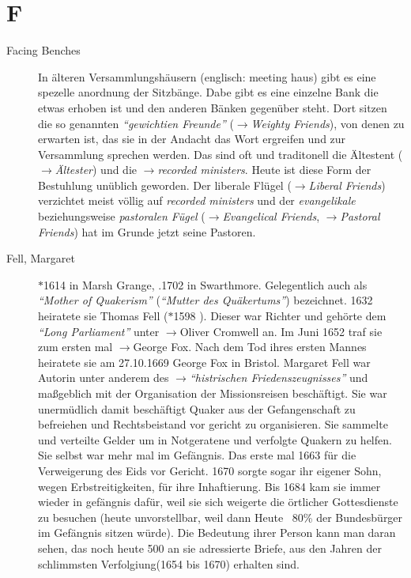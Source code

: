 \section*{F}

\articlesize

\begin{description}

\item[Facing Benches] In älteren Versammlungshäusern (englisch: meeting haus)
gibt es eine spezelle anordnung der Sitzbänge. Dabe gibt es eine einzelne Bank
die etwas erhoben ist und den anderen Bänken gegenüber steht. Dort sitzen die
so genannten \textit{"`gewichtien Freunde"'} ($\to$\textit{Weighty Friends}),
von denen zu erwarten ist, das sie in der Andacht das Wort ergreifen und zur
Versammlung sprechen werden. Das sind oft und traditonell die Ältestent
($\to$\textit{Ältester}) und die $\to$\textit{recorded ministers}. Heute ist
diese Form der Bestuhlung unüblich geworden. Der liberale Flügel
($\to$\textit{Liberal Friends}) verzichtet meist völlig auf
\textit{recorded ministers} und der \textit{evangelikale} beziehungsweise
\textit{pastoralen Fügel} ($\to$\textit{Evangelical Friends},
$\to$\textit{Pastoral Friends}) hat im Grunde jetzt seine Pastoren.


 \item[Fell, Margaret] $\ast$1614 in Marsh Grange, .1702 in Swarthmore.
 Gelegentlich auch als \textit{"`Mother of Quakerism"'} (\textit{"`Mutter des
 Quäkertums"'}) bezeichnet. 1632 heiratete sie Thomas Fell ($\ast$1598
 ). Dieser war Richter und gehörte dem \textit{"`Long Parliament"'}
 unter $\to$Oliver Cromwell an. Im Juni 1652 traf sie zum ersten mal
 $\to$George Fox. Nach dem Tod ihres ersten Mannes heiratete sie am 27.10.1669
 George Fox in Bristol. Margaret Fell war Autorin unter anderem des
 $\to$\textit{"`histrischen Friedenszeugnisses"'} und maßgeblich mit der
 Organisation der Missionsreisen beschäftigt.
\medskip 
 Sie war unermüdlich damit
 beschäftigt Quaker aus der Gefangenschaft zu befreiehen und Rechtsbeistand vor
 gericht zu organisieren. Sie sammelte und verteilte Gelder um in Notgeratene
 und verfolgte Quakern zu helfen. Sie selbst war mehr mal im Gefängnis. Das
 erste mal 1663 für die Verweigerung des Eids vor Gericht. 1670
 sorgte sogar ihr eigener Sohn, wegen Erbstreitigkeiten, für ihre Inhaftierung.
 Bis 1684 kam sie immer wieder in gefängnis dafür, weil sie sich weigerte die
 örtlicher Gottesdienste zu besuchen (heute unvorstellbar, weil dann Heute ~80\%
 der Bundesbürger im Gefängnis sitzen würde). Die Bedeutung ihrer Person kann
 man daran sehen, das noch heute 500 an sie adressierte Briefe, aus den Jahren
 der schlimmsten Verfolgiung(1654 bis 1670) erhalten sind.


\end{description}

